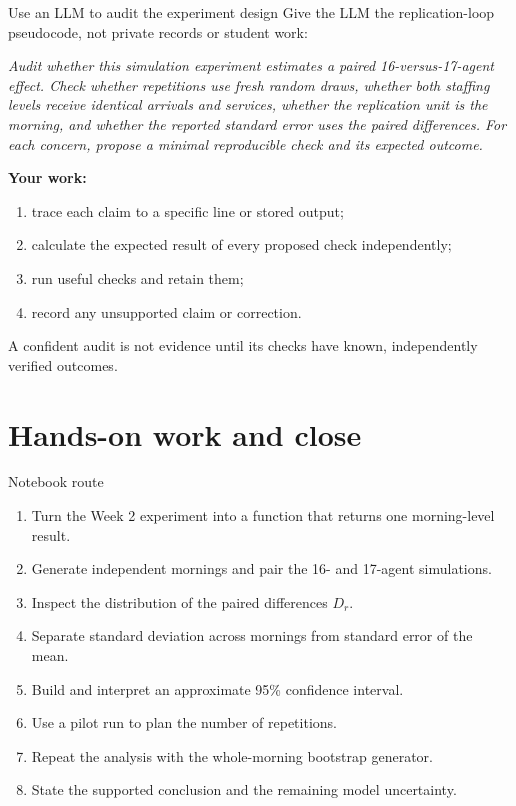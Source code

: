 \documentclass{beamer}
\begin{document}
\begin{frame}{Use an LLM to audit the experiment design}
  \footnotesize
  Give the LLM the replication-loop pseudocode, not private records or student work:

  \vspace{0.4em}
  \emph{Audit whether this simulation experiment estimates a paired 16-versus-17-agent effect. Check whether repetitions use fresh random draws, whether both staffing levels receive identical arrivals and services, whether the replication unit is the morning, and whether the reported standard error uses the paired differences. For each concern, propose a minimal reproducible check and its expected outcome.}

  \vspace{0.8em}
  \textbf{Your work:}
  \begin{enumerate}
    \item trace each claim to a specific line or stored output;
    \item calculate the expected result of every proposed check independently;
    \item run useful checks and retain them;
    \item record any unsupported claim or correction.
  \end{enumerate}

  A confident audit is not evidence until its checks have known, independently verified outcomes.
\end{frame}

\section{Hands-on work and close}

\begin{frame}{Notebook route}
  \begin{enumerate}
    \item Turn the Week 2 experiment into a function that returns one morning-level result.
    \item Generate independent mornings and pair the 16- and 17-agent simulations.
    \item Inspect the distribution of the paired differences $D_r$.
    \item Separate standard deviation across mornings from standard error of the mean.
    \item Build and interpret an approximate 95\% confidence interval.
    \item Use a pilot run to plan the number of repetitions.
    \item Repeat the analysis with the whole-morning bootstrap generator.
    \item State the supported conclusion and the remaining model uncertainty.
  \end{enumerate}
\end{frame}
\end{document}
